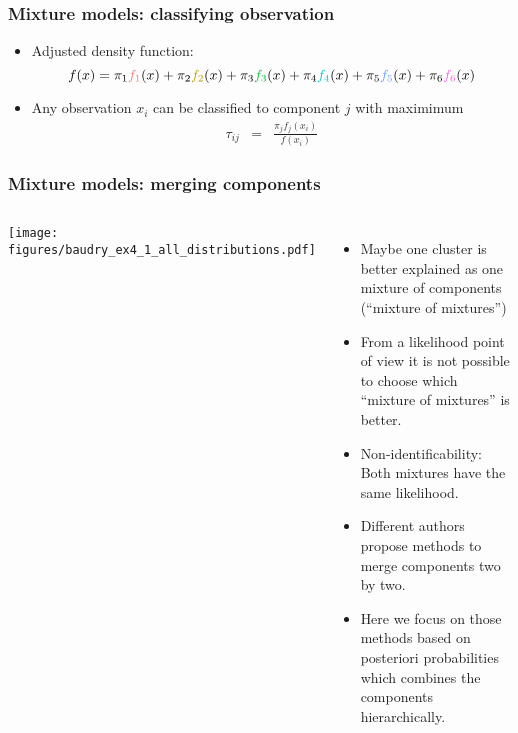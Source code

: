 \begin{frame}
\frametitle{Mixture models: classifying observation}

\begin{itemize}
\item Adjusted density function:
\[
f(x) = \pi_1 \gga{f_1}(x) + \pi_2 \ggb{f_2}(x) + \pi_3 \ggc{f_3}(x) + \pi_4 \ggd{f_4}(x) + \pi_5 \gge{f_5}(x) + \pi_6 \ggf{f_6}(x)
\]
\item Any observation $x_i$ can be classified to component $j$ with maximimum
\begin{eqnarray*} \tau_{ij} &=& \frac{\pi_j f_j(x_i)}{f(x_i) } \end{eqnarray*}
\end{itemize}

\end{frame}

\begin{frame}
\frametitle{Mixture models: merging components}

\begin{columns}[T]
\centering
\texttt{[image: figures/baudry\_ex4\_1\_all\_distributions.pdf]}

\bigskip
{}

\small
\begin{itemize}
\item Maybe one cluster is better explained as one mixture of components (``mixture of mixtures'')
\item<2-> From a likelihood point of view it is not possible to choose which ``mixture of mixtures'' is better.
\item<3-> Non-identificability: Both mixtures have the same likelihood.
\item<4> Different authors propose methods to merge components two by two.
\item<4> Here we focus on those methods based on posteriori probabilities which combines the components hierarchically.
\end{itemize}
\end{columns}
\end{frame}

